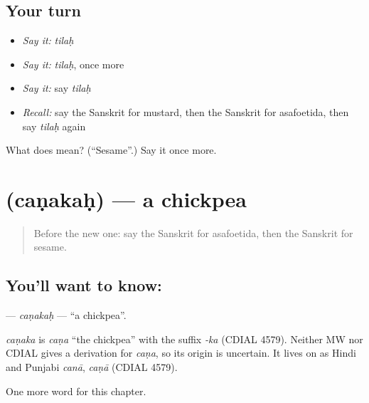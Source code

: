 \subsection*{Your turn}
\begin{itemize}
\raggedright
  \item \emph{Say it:} \emph{tilaḥ}
  \item \emph{Say it:} \emph{tilaḥ}, once more
  \item \emph{Say it:} say \emph{tilaḥ}
  \item \emph{Recall:} say the Sanskrit for mustard, then the Sanskrit for asafoetida, then say \emph{tilaḥ} again
\end{itemize}

\begin{tcolorbox}[breakable,colback=teal!4,colframe=teal!35!black,title={Before you move on}]
What does  mean? (\textquotedblleft{}Sesame\textquotedblright{}.) Say it once more.
\end{tcolorbox}
\section[\texorpdfstring{\sk{चणकः} (caṇakaḥ)}{चणकः (caṇakaḥ)}]{ (caṇakaḥ) — a chickpea}

\label{lesson:SA-C159-canakah}



\begin{quote}
Before the new one: say the Sanskrit for asafoetida, then the Sanskrit for sesame.
\end{quote}

\subsection*{You'll want to know: }
\textbf{} — \emph{caṇakaḥ} — \textquotedblleft{}a chickpea\textquotedblright{}.

\begin{cousinweb}
\emph{caṇaka} is \emph{caṇa} \textquotedblleft{}the chickpea\textquotedblright{} with the suffix \emph{-ka} (CDIAL 4579). Neither MW nor CDIAL gives a derivation for \emph{caṇa}, so its origin is uncertain. It lives on as Hindi and Punjabi \emph{canā}, \emph{caṇā} (CDIAL 4579).
\end{cousinweb}

\begin{grammarlens}[title={What you've built}]
One more word for this chapter.
\end{grammarlens}

